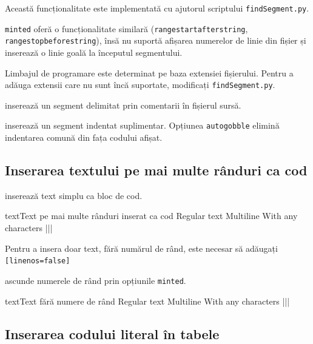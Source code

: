 \documentclass[a4paper,12pt]{report}
\begin{document}
Această funcționalitate este implementată cu ajutorul scriptului \texttt{findSegment.py}.

\verb|minted| oferă o funcționalitate similară (\verb|rangestartafterstring|, \verb|rangestopbeforestring|),
însă nu suportă afișarea numerelor de linie din fișier și inserează o linie goală la începutul segmentului.

Limbajul de programare este determinat pe baza extensiei fișierului.
Pentru a adăuga extensii care nu sunt încă suportate, modificați \texttt{findSegment.py}.

 inserează un segment delimitat prin comentarii în fișierul sursă.


 inserează un segment indentat suplimentar.
Opțiunea \verb|autogobble| elimină indentarea comună din fața codului afișat.


\subsection{Inserarea textului pe mai multe rânduri ca cod}

 inserează text simplu ca bloc de cod.

\begin{code}{text}{Text pe mai multe rânduri inserat ca cod}
Regular text
Multiline
With any characters |||
\end{code}

Pentru a insera doar text, fără numărul de rând, este necesar să adăugați \verb|[linenos=false]|

 ascunde numerele de rând prin opțiunile \verb|minted|.

\begin{code}{text}{Text fără numere de rând}
Regular text
Multiline
With any characters |||
\end{code}

\subsection{Inserarea codului literal în tabele}
\end{document}
